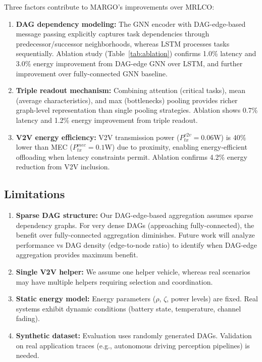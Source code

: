 \documentclass[journal,twoside]{IEEEtran}
\newcommand{\method}{\textsc{MARGO}}
\newcommand{\baseline}{\textsc{MRLCO}}
\begin{document}
Three factors contribute to \method{}'s improvements over \baseline{}:

\begin{enumerate}
    \item \textbf{DAG dependency modeling:} The GNN encoder with DAG-edge-based message passing explicitly captures task dependencies through predecessor/successor neighborhoods, whereas LSTM processes tasks sequentially. Ablation study (Table~\ref{tab:ablation}) confirms 1.0\% latency and 3.0\% energy improvement from DAG-edge GNN over LSTM, and further improvement over fully-connected GNN baseline.
    
    \item \textbf{Triple readout mechanism:} Combining attention (critical tasks), mean (average characteristics), and max (bottlenecks) pooling provides richer graph-level representation than single pooling strategies. Ablation shows 0.7\% latency and 1.2\% energy improvement from triple readout.
    
    \item \textbf{V2V energy efficiency:} V2V transmission power ($P_{tx}^{v2v} = 0.06$W) is 40\% lower than MEC ($P_{tx}^{mec} = 0.1$W) due to proximity, enabling energy-efficient offloading when latency constraints permit. Ablation confirms 4.2\% energy reduction from V2V inclusion.
\end{enumerate}

\subsection{Limitations}

\begin{enumerate}
    \item \textbf{Sparse DAG structure:} Our DAG-edge-based aggregation assumes sparse dependency graphs. For very dense DAGs (approaching fully-connected), the benefit over fully-connected aggregation diminishes. Future work will analyze performance vs DAG density (edge-to-node ratio) to identify when DAG-edge aggregation provides maximum benefit.
    
    \item \textbf{Single V2V helper:} We assume one helper vehicle, whereas real scenarios may have multiple helpers requiring selection and coordination.
    
    \item \textbf{Static energy model:} Energy parameters ($\rho$, $\zeta$, power levels) are fixed. Real systems exhibit dynamic conditions (battery state, temperature, channel fading).
    
    \item \textbf{Synthetic dataset:} Evaluation uses randomly generated DAGs. Validation on real application traces (e.g., autonomous driving perception pipelines) is needed.
\end{enumerate}
\end{document}
